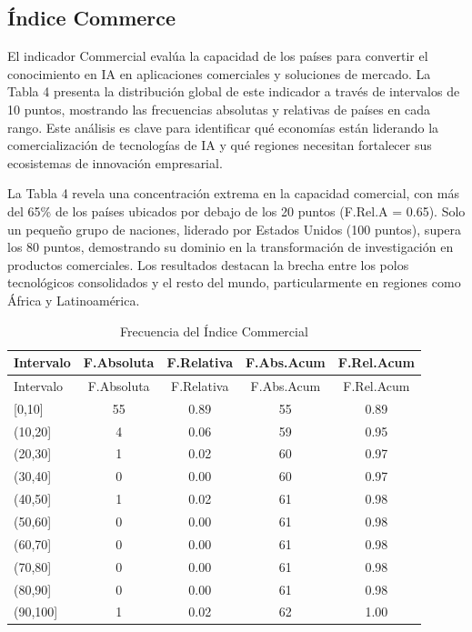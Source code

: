 \documentclass[
]{article}
\begin{document}
\begin{multicols}{2}

\subsection{Índice Commerce}

El indicador Commercial evalúa la capacidad de los países para convertir el conocimiento en IA en aplicaciones comerciales y soluciones de mercado. La Tabla 4 presenta la distribución global de este indicador a través de intervalos de 10 puntos, mostrando las frecuencias absolutas y relativas de países en cada rango. Este análisis es clave para identificar qué economías están liderando la comercialización de tecnologías de IA y qué regiones necesitan fortalecer sus ecosistemas de innovación empresarial.

La Tabla 4 revela una concentración extrema en la capacidad comercial, con más del 65\% de los países ubicados por debajo de los 20 puntos (F.Rel.A = 0.65). Solo un pequeño grupo de naciones, liderado por Estados Unidos (100 puntos), supera los 80 puntos, demostrando su dominio en la transformación de investigación en productos comerciales. Los resultados destacan la brecha entre los polos tecnológicos consolidados y el resto del mundo, particularmente en regiones como África y Latinoamérica.

\end{multicols}

\begin{longtable}[]{@{}lcccc@{}}
\caption{Frecuencia del Índice Commercial}\tabularnewline
\toprule\noalign{}
Intervalo & F.Absoluta & F.Relativa & F.Abs.Acum & F.Rel.Acum \\
\midrule\noalign{}
\endfirsthead
\toprule\noalign{}
Intervalo & F.Absoluta & F.Relativa & F.Abs.Acum & F.Rel.Acum \\
\midrule\noalign{}
\endhead
\bottomrule\noalign{}
\endlastfoot
{[}0,10{]} & 55 & 0.89 & 55 & 0.89 \\
(10,20{]} & 4 & 0.06 & 59 & 0.95 \\
(20,30{]} & 1 & 0.02 & 60 & 0.97 \\
(30,40{]} & 0 & 0.00 & 60 & 0.97 \\
(40,50{]} & 1 & 0.02 & 61 & 0.98 \\
(50,60{]} & 0 & 0.00 & 61 & 0.98 \\
(60,70{]} & 0 & 0.00 & 61 & 0.98 \\
(70,80{]} & 0 & 0.00 & 61 & 0.98 \\
(80,90{]} & 0 & 0.00 & 61 & 0.98 \\
(90,100{]} & 1 & 0.02 & 62 & 1.00 \\
\end{longtable}
\end{document}
